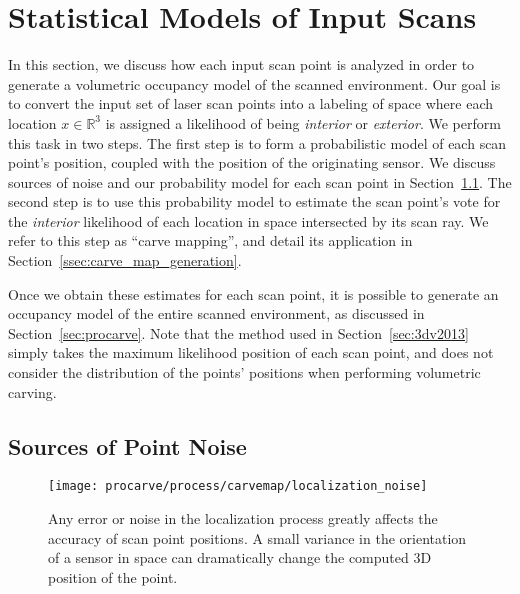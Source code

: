 \documentclass[12pt,onecolumn,oneside]{book}
\begin{document}
\section{Statistical Models of Input Scans}
\label{sec:fss_stats}


In this section, we discuss how each input scan point is analyzed in order to generate a volumetric occupancy model of the scanned environment.  Our goal is to convert the input set of laser scan points into a labeling of space where each location $x \in \mathbb{R}^3$ is assigned a likelihood of being {\it interior} or {\it exterior}.  We perform this task in two steps.  The first step is to form a probabilistic model of each scan point's position, coupled with the position of the originating sensor.  We discuss sources of noise and our probability model for each scan point in Section~\ref{ssec:point_noise_sources}.  The second step is to use this probability model to estimate the scan point's vote for the {\it interior} likelihood of each location in space intersected by its scan ray.  We refer to this step as ``carve mapping'', and detail its application in Section~\ref{ssec:carve_map_generation}.  

Once we obtain these estimates for each scan point, it is possible to generate an occupancy model of the entire scanned environment, as discussed in Section~\ref{sec:procarve}.  Note that the method used in Section~\ref{sec:3dv2013} simply takes the maximum likelihood position of each scan point, and does not consider the distribution of the points' positions when performing volumetric carving.

\subsection{Sources of Point Noise}
\label{ssec:point_noise_sources}

\begin{figure}[t]
	\centerline{\texttt{[image: procarve/process/carvemap/localization\_noise]}}
	
	\caption[Example of localization noise affecting point accuracy.]{Any error or noise in the localization process greatly affects the accuracy of scan point positions.  A small variance in the orientation of a sensor in space can dramatically change the computed 3D position of the point.}
	\label{fig:localization_noise}
\end{figure}
\end{document}
